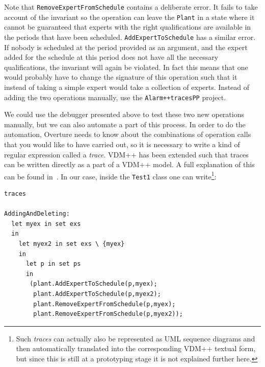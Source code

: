 \noindent Note that \texttt{RemoveExpertFromSchedule} contains a
deliberate error. It fails to take account of the invariant so the
operation can leave the \texttt{Plant} in a state where it cannot be
guaranteed that experts with the right qualifications are available in
the periods that have been scheduled. \texttt{AddExpertToSchedule} has
a similar error.  If nobody is scheduled at the period provided as an
argument, and the expert added for the schedule at this period does
not have all the necessary qualifications, the invariant will again be
violated. In fact this means that one would probably have to change
the signature of this operation such that it instead of taking a
simple expert would take a collection of experts. Instead of adding the 
two operations manually, use the \texttt{Alarm++tracesPP} project.

We could use the debugger presented above to test these two new 
operations manually, but we can also automate a part of this process.
In order to do the automation, Overture needs to know about the
combinations of operation calls that you would like to have carried
out, so it is necessary to write a kind of regular expression called a
\emph{trace}. VDM++ has been extended such that traces can be written
directly as a part of a VDM++ model. A full explanation of this can be
found in~\cite{Larsen&09d}. In our case, inside the \texttt{Test1}
class one can write\footnote{Such \emph{traces} can actually also be
  represented as UML sequence diagrams and then automatically
  translated into the corresponding VDM++ textual form, but since this
is still at a prototyping stage it is not explained further here.}:

\begin{lstlisting}
traces

AddingAndDeleting: 
  let myex in set exs
  in
    let myex2 in set exs \ {myex}
    in
      let p in set ps 
      in
       (plant.AddExpertToSchedule(p,myex);
        plant.AddExpertToSchedule(p,myex2);
        plant.RemoveExpertFromSchedule(p,myex);
        plant.RemoveExpertFromSchedule(p,myex2));
\end{lstlisting}

